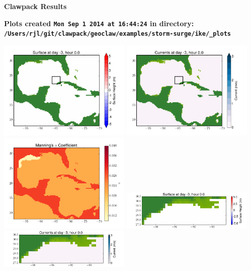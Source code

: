 \documentclass[11pt]{article}
\begin{document}
        \begin{center}{\Large\bf Clawpack Results}\vskip 5pt
        
        \bf Plots created {\tt Mon Sep  1 2014 at 16:44:24} in directory: \vskip 5pt
        \verb+/Users/rjl/git/clawpack/geoclaw/examples/storm-surge/ike/_plots+
        \end{center}
        \vskip 5pt
        \includegraphics[width=0.475\textwidth]{frame0000fig1.png}
\includegraphics[width=0.475\textwidth]{frame0000fig2.png}
\vskip 10pt 
\includegraphics[width=0.475\textwidth]{frame0000fig3.png}
\includegraphics[width=0.475\textwidth]{frame0000fig4.png}
\vskip 10pt 
\includegraphics[width=0.475\textwidth]{frame0000fig5.png}
\end{document}
